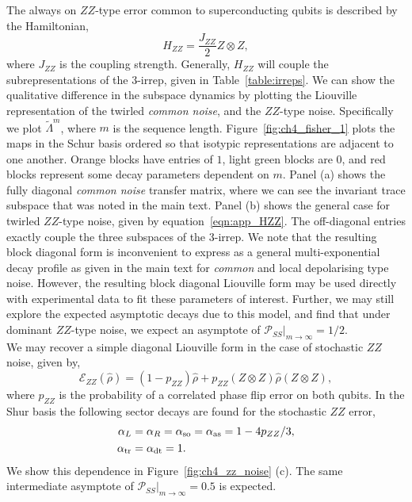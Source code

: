 The always on $ZZ$-type error common to superconducting qubits is described by
the Hamiltonian,
\begin{equation}
\label{eqn:app_HZZ}
H_{ZZ} = \frac{J_{ZZ}}{2}Z\otimes Z,
\end{equation}
where $J_{ZZ}$ is the coupling strength.
Generally, $H_{ZZ}$ will couple
the subrepresentations of the $3$-irrep, given in Table~\ref{table:irreps}. We can show the qualitative difference in the subspace dynamics by plotting the Liouville representation of the twirled \emph{common noise}, and the $ZZ$-type noise. Specifically we plot $\tilde\Lambda^m$, where $m$ is the sequence length. Figure~\ref{fig:ch4_fisher_1} plots the maps in the Schur basis
ordered so that isotypic representations are adjacent to one another. Orange blocks have entries of $1$, light green blocks are $0$, and red blocks represent some decay parameters dependent on $m$.
Panel (a) shows the fully diagonal \emph{common noise} transfer matrix, where we can see the invariant trace subspace that was noted in the main text. Panel (b) shows the general case for twirled $ZZ$-type noise, given by equation~\ref{eqn:app_HZZ}. The off-diagonal entries exactly couple the three subspaces of the $3$-irrep.
We note that the resulting block diagonal form is inconvenient to express as a
general multi-exponential decay profile as given in the main text for \emph{common} and local depolarising type noise. However, the resulting block diagonal Liouville
form may be used directly with experimental data to fit these parameters of
interest. Further, we may still explore the expected asymptotic decays due to this model, and find that under dominant $ZZ$-type noise, we expect an asymptote of $\mathcal{P}_{SS}|_{m\rightarrow\infty}=1/2$.\\

We may recover a simple diagonal Liouville form in the case of stochastic $ZZ$ noise, given by,
\begin{equation}
\mathcal{E}_{ZZ}(\hat\rho) = (1-p_{ZZ})\hat\rho + p_{ZZ} (Z\otimes Z)\hat\rho(Z\otimes Z),
\end{equation}
where $p_{ZZ}$ is the probability of a correlated phase flip error on both qubits.
In the Shur basis the following sector decays are found for the stochastic $ZZ$ error,
\begin{equation}
    \begin{split}
        \alpha_L&=\alpha_R=\alpha_{\rm so}=\alpha_{\rm as}= 1- 4p_{ZZ}/3, \\
        \alpha_{\rm tr} &= \alpha_{\rm dt} = 1.\\
    \end{split}
\end{equation}
We show this dependence in Figure~\ref{fig:ch4_zz_noise} (c).
The same intermediate asymptote of $\mathcal{P}_{SS}|_{m\rightarrow\infty} = 0.5$ is expected. \\

